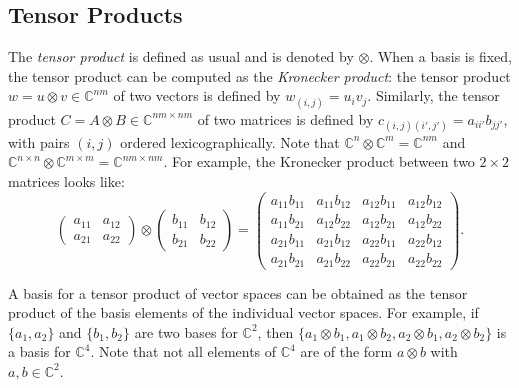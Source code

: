 \documentclass[12pt]{dalthesis}
\begin{document}
\subsection{Tensor Products}
\label{tensor products}
The \emph{tensor product} is defined as usual and is denoted by $\otimes$. When a basis is fixed, the tensor product can be computed as the \emph{Kronecker product}: the tensor product $w = u \otimes v \in \mathbb{C}^{nm}$ of two vectors is defined by $w_{(i, j)} = u_iv_j$. Similarly, the tensor product $C = A \otimes B \in \mathbb{C}^{nm \times nm}$ of two matrices is defined by $c_{(i, j)(i', j')} = a_{ii'}b_{jj'}$, with pairs $(i, j)$ ordered lexicographically. Note that $\mathbb{C}^n \otimes \mathbb{C}^m = \mathbb{C}^{nm}$ and $\mathbb{C}^{n \times n} \otimes \mathbb{C}^{m \times m} = \mathbb{C}^{nm \times nm}$. For example, the Kronecker product between two $2 \times 2$ matrices looks like:
\begin{equation*}
\begin{pmatrix}
a_{11} & a_{12} \\
a_{21} & a_{22} 
\end{pmatrix} 
\otimes 
\begin{pmatrix}
b_{11} & b_{12} \\
b_{21} & b_{22} 
\end{pmatrix} 
=
\begin{pmatrix}
a_{11}b_{11} & a_{11}b_{12} & a_{12}b_{11} & a_{12}b_{12} \\
a_{11}b_{21} & a_{12}b_{22} & a_{12}b_{21} & a_{12}b_{22} \\
a_{21}b_{11} & a_{21}b_{12} & a_{22}b_{11} & a_{22}b_{12} \\
a_{21}b_{21} & a_{21}b_{22} & a_{22}b_{21} & a_{22}b_{22}
\end{pmatrix}.
\end{equation*}


A basis for a tensor product of vector spaces can be obtained as the tensor product of the basis elements of the individual vector spaces. For example, if $\{ a_1, a_2 \}$ and $\{ b_1 , b_2  \}$ are two bases for $\mathbb{C}^2$, then $\{ a_1 \otimes b_1, a_1 \otimes b_2, a_2 \otimes b_1, a_2 \otimes b_2 \}$ is a basis for $\mathbb{C}^4$. Note that not all elements of $\mathbb{C}^4$ are of the form $a \otimes b$ with $a, b \in \mathbb{C}^2$.
\end{document}
